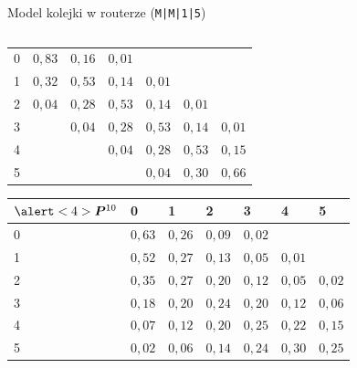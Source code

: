 \documentclass{mp}
\begin{document}
\begin{frame}{Model kolejki w routerze (\texttt{M|M|1|5})}
{\begin{columns}[T]
\begin{column}{.49\textwidth}
{{\begin{tabular}{l|llllll}
\hline
0 & $0{,}83$ & $0{,}16$ & $0{,}01$ &  &  & \\
1 & $0{,}32$ & $0{,}53$ & $0{,}14$ & $0{,}01$ &  &  \\
2 & $0{,}04$ & $0{,}28$ & $0{,}53$ & $0{,}14$ & $0{,}01$ & \\
3 &  & $0{,}04$ & $0{,}28$ & $0{,}53$ & $0{,}14$ & $0{,}01$ \\
4 &  &  & $0{,}04$ & $0{,}28$ & $0{,}53$ & $0{,}15$ \\
5 &  &  &  & $0{,}04$ & $0{,}30$ & $0{,}66$
\end{tabular}
}
{
\begin{tabular}{l|llllll}
$\alert<4>{\bm{P}^{10}}$ & 0 & 1 & 2 & 3 & 4 & 5\\
\hline
 0 &  $0{,}63$ & $0{,}26$ & $0{,}09$ & $0{,}02$ &  &  \\
 1 &  $0{,}52$ & $0{,}27$ & $0{,}13$ & $0{,}05$ & $0{,}01$ &  \\
 2 &  $0{,}35$ & $0{,}27$ & $0{,}20$ & $0{,}12$ & $0{,}05$ & $0{,}02$ \\
 3 &  $0{,}18$ & $0{,}20$ & $0{,}24$ & $0{,}20$ & $0{,}12$ & $0{,}06$ \\
 4 &  $0{,}07$ & $0{,}12$ & $0{,}20$ & $0{,}25$ & $0{,}22$ & $0{,}15$ \\
 5 &  $0{,}02$ & $0{,}06$ & $0{,}14$ & $0{,}24$ & $0{,}30$ & $0{,}25$ \\
\end{tabular}
}
}
\end{column}
\end{columns}
}
\end{frame}
\end{document}
